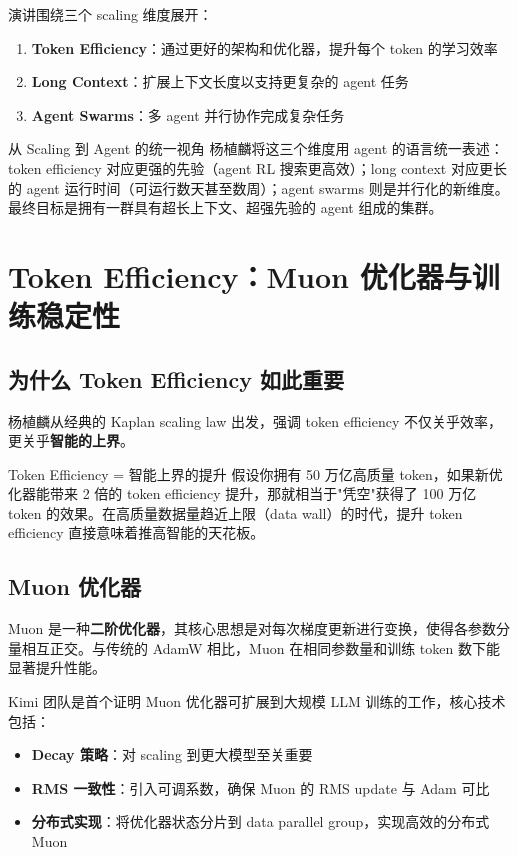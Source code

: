 \documentclass[a4paper]{article}
\begin{document}
演讲围绕三个 scaling 维度展开：
\begin{enumerate}
    \item \textbf{Token Efficiency}：通过更好的架构和优化器，提升每个 token 的学习效率
    \item \textbf{Long Context}：扩展上下文长度以支持更复杂的 agent 任务
    \item \textbf{Agent Swarms}：多 agent 并行协作完成复杂任务
\end{enumerate}

\begin{knowledgebox}{从 Scaling 到 Agent 的统一视角}
杨植麟将这三个维度用 agent 的语言统一表述：token efficiency 对应更强的先验（agent RL 搜索更高效）；long context 对应更长的 agent 运行时间（可运行数天甚至数周）；agent swarms 则是并行化的新维度。最终目标是拥有一群具有超长上下文、超强先验的 agent 组成的集群。
\end{knowledgebox}


\section{Token Efficiency：Muon 优化器与训练稳定性}

\subsection{为什么 Token Efficiency 如此重要}

杨植麟从经典的 Kaplan scaling law 出发，强调 token efficiency 不仅关乎效率，更关乎\textbf{智能的上界}。

\begin{importantbox}{Token Efficiency = 智能上界的提升}
假设你拥有 50 万亿高质量 token，如果新优化器能带来 2 倍的 token efficiency 提升，那就相当于"凭空"获得了 100 万亿 token 的效果。在高质量数据量趋近上限（data wall）的时代，提升 token efficiency 直接意味着推高智能的天花板。
\end{importantbox}

\subsection{Muon 优化器}

Muon 是一种\textbf{二阶优化器}，其核心思想是对每次梯度更新进行变换，使得各参数分量相互正交。与传统的 AdamW 相比，Muon 在相同参数量和训练 token 数下能显著提升性能。

Kimi 团队是首个证明 Muon 优化器可扩展到大规模 LLM 训练的工作，核心技术包括：
\begin{itemize}
    \item \textbf{Decay 策略}：对 scaling 到更大模型至关重要
    \item \textbf{RMS 一致性}：引入可调系数，确保 Muon 的 RMS update 与 Adam 可比
    \item \textbf{分布式实现}：将优化器状态分片到 data parallel group，实现高效的分布式 Muon
\end{itemize}
\end{document}
